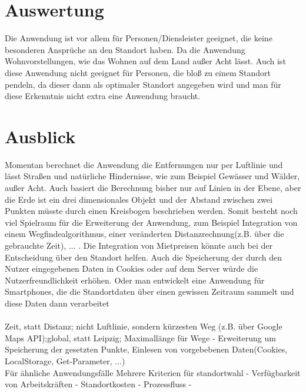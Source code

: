 \documentclass[a4paper, twoside, 12pt]{scrreprt}
\begin{document}
\section{Auswertung}
Die Anwendung ist vor allem für Personen/Diensleister geeignet, die keine besonderen Ansprüche an den Standort haben. Da die Anwendung Wohnvorstellungen, wie das Wohnen auf dem Land außer Acht lässt. Auch ist diese Anwendung nicht geeignet für Personen, die bloß zu einem Standort pendeln, da dieser dann als optimaler Standort angegeben wird und man für diese Erkenntnis nicht extra eine Anwendung braucht.
\section{Ausblick}
Momentan berechnet die Anwendung die Entfernungen nur per Luftlinie und lässt Straßen und natürliche Hindernisse, wie zum Beispiel Gewässer und Wälder, außer Acht.
Auch basiert die Berechnung bisher nur auf Linien in der Ebene, aber die Erde ist ein drei dimensionales Objekt und der Abstand zwischen zwei Punkten müsste durch einen Kreisbogen beschrieben werden.
Somit besteht noch viel Spielraum für die Erweiterung der Anwendung, zum Beispiel Integration von einem Wegfindealgorithmus, einer veränderten Distanzrechnung(z.B. über die gebrauchte Zeit), ... .
Die Integration von Mietpreisen könnte auch bei der Entscheidung über den Standort helfen.
Auch die Speicherung der durch den Nutzer eingegebenen Daten in Cookies oder auf dem Server würde die Nutzerfreundlichkeit erhöhen. Oder man entwickelt eine Anwendung für Smartphones, die die Standortdaten über einen gewissen Zeitraum sammelt und diese Daten dann verarbeitet \\\\
Zeit, statt Distanz; nicht Luftlinie, sondern kürzesten Weg (z.B. über Google Maps API);global, statt Leipzig; Maximallänge für Wege
- Erweiterung um Speicherung der gesetzten Punkte, Einlesen von vorgebebenen Daten(Cookies, LocalStorage, Get-Parameter, ...)\\

Für ähnliche Anwendungsfälle
Mehrere Kriterien für standortwahl
- Verfügbarkeit von Arbeitskräften
- Standortkosten
- Prozessfluss
- 

{}

\end{document}
